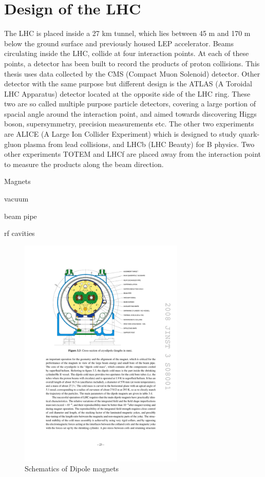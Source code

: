 \section{Design of the LHC}

The LHC is placed inside a 27 km tunnel, which lies between 45 m and 170 m below the ground surface and previously housed LEP accelerator. Beams circulating inside the LHC, collide at four interaction points. At each of these points, a detector has been built to record the products of proton collisions. This thesis uses data collected by the CMS (Compact Muon Solenoid) detector. Other detector with the same purpose but different design is the ATLAS (A Toroidal LHC Apparatus) detector located at the opposite side of the LHC ring. These two are so called multiple purpose particle detectors, covering a large portion of spacial angle around the interaction point, and aimed towards discovering Higgs boson, supersymmetry, precision measurements etc. The other two experiments are ALICE (A Large Ion Collider Experiment) which is designed to study quark-gluon plasma from lead collisions, and LHCb (LHC Beauty) for B physics. Two other experiments TOTEM and LHCf are placed away from the interaction point to measure the products along the beam direction.
\par Magnets
\par vacuum
\par beam pipe
\par rf cavities
    

\begin{figure}[htbp]
	\centering
		\includegraphics[width=0.7\textwidth]{Figures/LHC_magnet.pdf}
	\caption[Schematics of dipole magnets]{Schematics of Dipole magnets \cite{Evans:2008zzb}}
	\label{fig:LHC_mag}
\end{figure}

